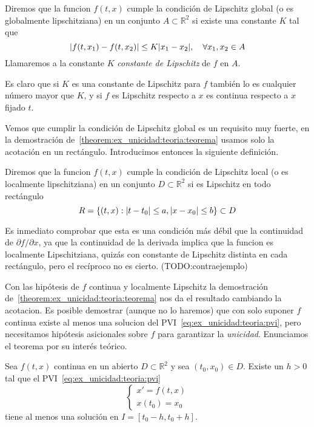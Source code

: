 \documentclass[../ecuaciones_diferenciales.tex]{subfiles}
\begin{document}
\begin{definition}
    Diremos que la funcion \(f(t, x)\) cumple la condición de Lipschitz global (o es globalmente lipschitziana) en un 
    conjunto \(A \subset \mathbb{R}^2\) si existe una constante \(K\) tal que
    \[
        \abs{f(t, x_1) - f(t, x_2)} \leq K \abs{x_1 - x_2} , \quad \forall x_1, x_2 \in A
    \]
    Llamaremos a la constante \(K\) \emph{constante de Lipschitz} de \(f\) en \(A\).
\end{definition}

Es claro que si \(K\) es una constante de Lipschitz para \(f\) también lo es cualquier número mayor que \(K\),
y si \(f\) es Lipschitz respecto a \(x\) es continua respecto a \(x\) fijado \(t\).

Vemos que cumplir la condición de Lipschitz global es un requisito muy fuerte, en la demostración de~\ref{theorem:ex_unicidad:teoria:teorema}
usamos solo la acotación en un rectángulo. Introducimos entonces la siguiente definición.

\begin{definition}
    Diremos que la funcion \(f(t, x)\) cumple la condición de Lipschitz local (o es localmente lipschitziana) en un 
    conjunto \(D \subset \mathbb{R}^2\) si es Lipschitz en todo rectángulo
    \[
        R = \{(t, x) : \abs{t - t_0} \leq a, \abs{x - x_0} \leq b\} \subset D
    \]
\end{definition}

Es inmediato comprobar que esta es una condición más débil que la continuidad de \(\partial f / \partial x\),
ya que la continuidad de la derivada implica que la funcion es localmente Lipschitziana, quizás con constante 
de Lipschitz distinta en cada rectángulo, pero el recíproco no es cierto. (TODO:\@ contraejemplo)

Con las hipótesis de \(f\) continua y localmente Lipschitz la demostración de~\ref{theorem:ex_unicidad:teoria:teorema}
nos da el resultado cambiando la acotacion. Es posible demostrar (aunque no lo haremos) que con solo suponer
\(f\) continua existe al menos una solucion del PVI~\ref{eq:ex_unicidad:teoria:pvi}, pero
necesitamos hipótesis asicionales sobre \(f\) para garantizar la \emph{unicidad}. Enunciamos el teorema por su interés teórico.

\begin{theorem}
    Sea \(f(t, x)\) continua en un abierto \(D \subset \mathbb{R}^2\) y sea \((t_0, x_0) \in D\).
    Existe un \(h > 0\) tal que el PVI~\ref{eq:ex_unicidad:teoria:pvi} 
    \[
        \begin{cases}
            x' = f(t, x) \\
            x(t_0) = x_0
        \end{cases}
    \]
    tiene al menos una solución en \(I = [t_0 - h, t_0 + h]\).
\end{theorem}
\end{document}
